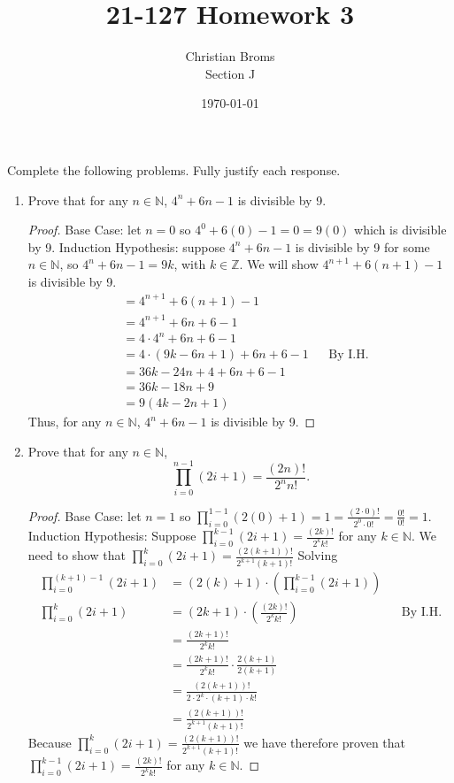 \documentclass[12pt]{article}
\newcommand{\Z}{\mathbb{Z}}
\newcommand{\N}{\mathbb{N}}
\begin{document}
\title{21-127 Homework 3}
\author{Christian Broms \\ Section J}
\date{\today}
\maketitle

Complete the following problems. Fully justify each response.

\begin{enumerate}

\item Prove that for any $n\in\N$, $4^n+6n-1$ is divisible by 9.

\begin{proof}

Base Case: let $n = 0$ so $4^0 + 6(0) - 1 = 0 = 9(0)$ which is divisible by 9. \hfill \break \break
Induction Hypothesis: suppose $4^n+6n-1$ is divisible by 9 for some $n \in \N$, so $4^n+6n-1 = 9k$, with $k \in \Z$. \hfill \break \break
We will show $4^{n+1} + 6(n+1) - 1$ is divisible by 9. 
\begin{align*}
&= 4^{n+1} + 6(n+1) - 1\\
&= 4^{n+1} + 6n + 6 - 1\\
&= 4 \cdot 4^{n} + 6n + 6 - 1 \\
&= 4 \cdot (9k - 6n + 1) + 6n + 6 - 1 && \text{By I.H.}\\
&= 36k - 24n + 4 + 6n + 6 - 1 \\
&= 36k - 18n + 9 \\
&= 9(4k - 2n + 1) 
\end{align*}
Thus, for any $n\in\N$, $4^n+6n-1$ is divisible by 9.
\end{proof}


\item Prove that for any $n\in\N$, \[\displaystyle\prod_{i=0}^{n-1} (2i+1) = \frac{(2n)!}{2^nn!}.\]

\begin{proof}
Base Case: let $n = 1$ so $\displaystyle\prod_{i=0}^{1-1} (2(0)+1) =1 = \frac{(2\cdot0)!}{2^0 \cdot 0!} = \frac{0!}{0!} = 1$. \hfill \break \break
Induction Hypothesis: Suppose $\displaystyle\prod_{i=0}^{k-1} (2i+1) = \frac{(2k)!}{2^kk!}$ for any $k \in \N$. We need to show that $\displaystyle\prod_{i=0}^{k} (2i+1) = \frac{(2(k + 1))!}{2^{k+1}(k+1)!}$ Solving 
\begin{align*}
\displaystyle\prod_{i=0}^{(k+1)-1} (2i+1) &= (2(k) + 1) \cdot \left(\prod_{i=0}^{k-1} (2i+1)\right) \\
\displaystyle\prod_{i=0}^{k} (2i+1)&= (2k + 1) \cdot \left(\frac{(2k)!}{2^kk!}\right) && \text{By I.H.} \\
&= \frac{(2k + 1)!}{2^kk!} \\
&= \frac{(2k + 1)!}{2^kk!} \cdot \frac{2(k + 1)}{2(k + 1)} \\
&= \frac{(2(k + 1))!}{2 \cdot 2^k \cdot (k+ 1) \cdot k!} \\
&= \frac{(2(k + 1))!}{2^{k+1}(k+1)!}
\end{align*}
Because $\displaystyle\prod_{i=0}^{k} (2i+1) = \frac{(2(k + 1))!}{2^{k+1}(k+1)!}$ we have therefore proven that $\displaystyle\prod_{i=0}^{k-1} (2i+1) = \frac{(2k)!}{2^kk!}$ for any $k \in \N$.
\end{proof}


\end{enumerate}
\end{document}
